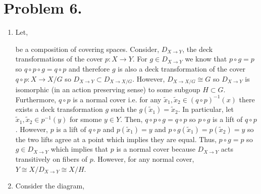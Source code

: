 \documentclass[12pt]{extarticle}
\begin{document}
\section*{Problem 6.}   

\begin{enumerate}
\item Let,

\begin{center}
\end{center}

be a composition of covering spaces. Consider, $D_{X \to Y}$, the deck transformations of the cover $p : X \to Y$. For $g \in D_{X \to Y}$ we know that $p \circ g = p$ so $q \circ p \circ g = q \circ p$ and therefore $g$ is also a deck transformation of the cover $q \circ p : X \to X/G$ so $D_{X \to Y} \subset D_{X \to X/G}$. However, $D_{X \to X/G} \cong G$ so $D_{X \to Y}$ is isomorphic (in an action preserving sense) to some subgoup $H \subset G$. Furthermore, $q \circ p$ is a normal cover i.e. for any $\tilde{x}_1, \tilde{x}_2 \in (q \circ p)^{-1}(x)$ there exists a deck transformation $g$ such the $g(\tilde{x}_1) = \tilde{x}_2$. In particular, let $\tilde{x}_1, \tilde{x}_2 \in p^{-1}(y)$ for smome $y \in Y$. Then, $q \circ p \circ g = q \circ p$ so $p \circ g$ is a lift of $q \circ p$. However, $p$ is a lift of $q \circ p$ and $p(\tilde{x}_1) = y$ and $p \circ g(\tilde{x}_1) = p(\tilde{x}_2) = y$ so the two lifts agree at a point which implies they are equal. Thus, $p \circ g = p$ so $g \in D_{X \to Y}$ which implies that $p$ is a normal cover because $D_{X \to Y}$ acts transitively on fibers of $p$. However, for any normal cover, $Y \cong X/D_{X \to Y} \cong X/H$. 

\item Consider the diagram,

\begin{center}
\end{center}


\end{enumerate}
\end{document}
